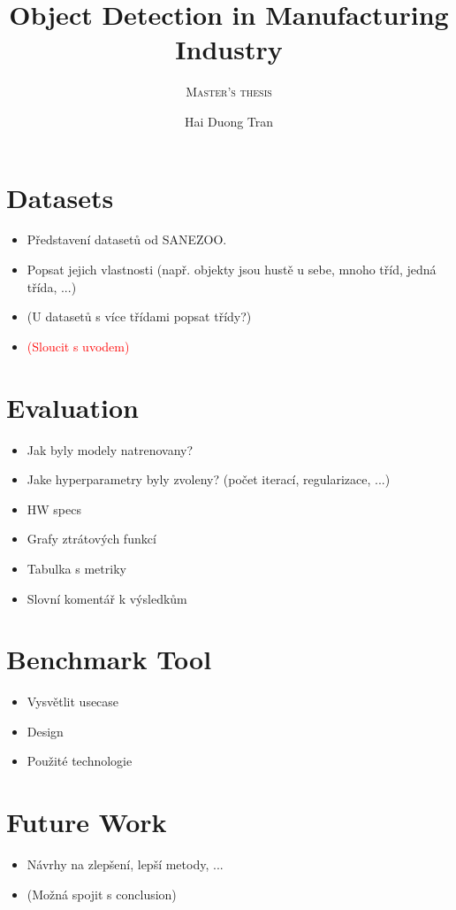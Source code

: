 \documentclass{mimosis}
\title{Object Detection in Manufacturing Industry}
\subtitle{\textsc{Master's thesis}}
\author{Hai Duong Tran}
\newcommand{\todo}[1]{\textcolor{red}{(#1)}}
\begin{document}
\frontmatter
%   
%   
%   
%   
  \tableofcontents

\mainmatter

    \let\cleardoublepage\clearpage
    
    
    \chapter{Datasets}
     \begin{itemize}
      \item Představení datasetů od SANEZOO.
      \item Popsat jejich vlastnosti (např. objekty jsou hustě u sebe, mnoho tříd, jedná třída, ...)
      \item (U datasetů s více třídami popsat třídy?)
      \item \todo{Sloucit s uvodem}
     \end{itemize}
    
    
    
    \chapter{Evaluation}
    \begin{itemize}
    \item Jak byly modely natrenovany?
    \item Jake hyperparametry byly zvoleny? (počet iterací, regularizace, ...)
    \item HW specs
    \item Grafy ztrátových funkcí
    \item Tabulka s metriky
    \item Slovní komentář k výsledkům
    \end{itemize}
    
    \chapter{Benchmark Tool}
    \begin{itemize}
    \item Vysvětlit usecase
    \item Design 
    \item Použité technologie
    \end{itemize}
    
    \chapter{Future Work}
    \begin{itemize}
    \item Návrhy na zlepšení, lepší metody, ...
    \item (Možná spojit s conclusion)
    \end{itemize}
    
\end{document}
